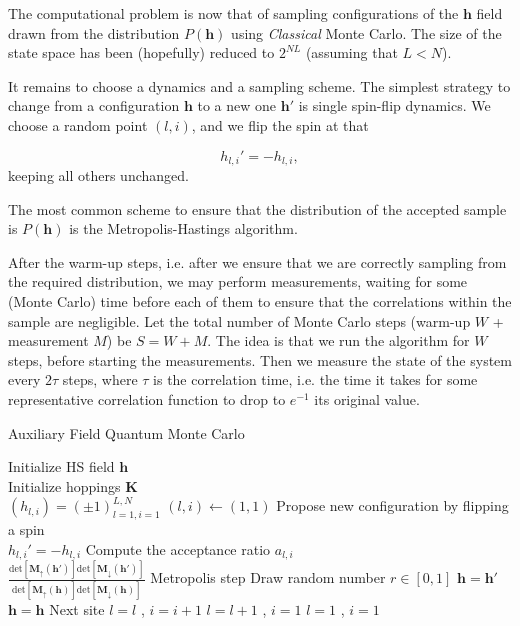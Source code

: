 The computational problem is now that of sampling configurations of the $\bm h$ field drawn from the distribution $P(\bm h)$ using \emph{Classical} Monte Carlo. The size of the state space has been (hopefully) reduced to $2^{NL}$ (assuming that $L < N$).

It remains to choose a dynamics and a sampling scheme. The simplest strategy to change from a configuration $\bm h$ to a new one $\bm h'$ is single spin-flip dynamics. We choose a random point $(l, i)$, and we flip the spin at that 

\begin{equation}
h_{l, i}' = - h_{l, i},
\end{equation}
keeping all others unchanged.

The most common scheme to ensure that the distribution of the accepted sample is $P(\bm h)$ is the Metropolis-Hastings algorithm.

After the warm-up steps, i.e. after we ensure that we are correctly sampling from the required distribution, we may perform measurements, waiting for some (Monte Carlo) time before each of them to ensure that the correlations within the sample are negligible. Let the total number of Monte Carlo steps (warm-up $W$ + measurement $M$) be $S = W + M$. The idea is that we run the algorithm for $W$ steps, before starting the measurements. Then we measure the state of the system every $2\tau$ steps, where $\tau$ is the correlation time, i.e. the time it takes for some representative correlation function to drop to $e^{-1}$ its original value.


\begin{algorithm}
\caption{Auxiliary Field Quantum Monte Carlo}
\label{afqmcSampling}
\begin{algorithmic}[5]
  \STATE Initialize HS field $\bm h$  \\
  \STATE Initialize hoppings $\bm K$  \\
  \STATE  $(h_{l, i}) = (\pm 1)_{l=1, i = 1}^{L, N}$
  \STATE $(l, i) \leftarrow (1, 1)$
  \STATE \footnotesize{Propose new configuration by flipping a spin} \\ \normalsize{$h_{l, i}' = - h_{l, i}$} 
  \STATE \footnotesize{Compute the acceptance ratio $a_{l, i}$} \\
  \normalsize{$\frac{\text{det}[\bm M_\uparrow (\bm h')]\text{det}[\bm M_\downarrow (\bm h')]}{\text{det}[\bm M_\uparrow (\bm h)]\text{det}[\bm M_\downarrow (\bm h)]}$}
  \STATE \normalsize{Metropolis step}
  \STATE \footnotesize{Draw random number $r \in [0,1]$}
  \STATE $\bm h = \bm h'$
  \ELSE
  \STATE $\bm h = \bm h$
  \ENDIF
  \STATE Next site
  \STATE $l = l$ , $i = i +1 $
  \ELSE
  \STATE $l = l+1$ , $i = 1 $
  \ENDIF
  \STATE $l = 1$ , $i=1$
  \ENDIF
  \ENDIF
  \ENDFOR
\end{algorithmic}
\end{algorithm}

